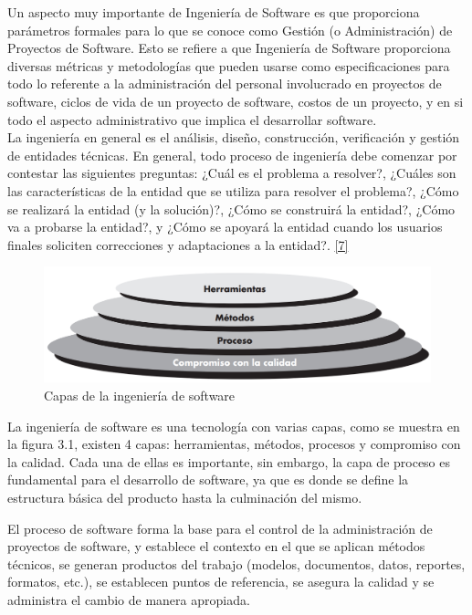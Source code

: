 Un aspecto muy importante de Ingeniería de Software es que proporciona parámetros formales para lo que se conoce como Gestión (o Administración) de Proyectos de Software. Esto se refiere a que Ingeniería de Software proporciona diversas métricas y metodologías que pueden usarse como especificaciones para todo lo referente a la administración del personal involucrado en proyectos de software, ciclos de vida de un proyecto de software, costos de un proyecto, y en si todo el aspecto administrativo que
implica el desarrollar software.\\

La ingeniería en general es el análisis, diseño, construcción, verificación y gestión de entidades técnicas. En general, todo proceso de ingeniería debe comenzar por contestar las siguientes preguntas: ¿Cuál es el problema a
resolver?, ¿Cuáles son las características de la entidad que se utiliza para resolver el problema?, ¿Cómo se realizará la entidad (y la solución)?, ¿Cómo se construirá la entidad?, ¿Cómo va a probarse la entidad?, y ¿Cómo se apoyará la entidad cuando los
usuarios finales soliciten correcciones y adaptaciones a la entidad?.  \hyperlink{b07}{[7]}  \\

\begin{figure}[H]
	\begin{center}
		\includegraphics[width=.95\textwidth]{images/CapasIS}
		\caption{Capas de la ingeniería de software}
		\label{fig:capas_is}
	\end{center}
\end{figure}

La ingeniería de software es una tecnología con varias capas, como se muestra en la figura 3.1, existen 4 capas: herramientas, métodos, procesos y compromiso con la calidad. Cada una de ellas es importante, sin embargo, la capa de proceso es fundamental para el desarrollo de software, ya que es donde se define la estructura básica del producto hasta la culminación del mismo.

El proceso de software forma la base para el control de la administración de proyectos de software, y establece el contexto en el que se aplican métodos técnicos, se generan productos del trabajo (modelos, documentos, datos, reportes, formatos, etc.), se establecen puntos de referencia, se asegura la calidad y se administra el cambio de manera apropiada.

